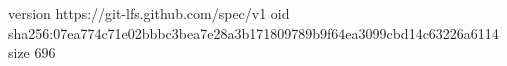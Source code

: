 version https://git-lfs.github.com/spec/v1
oid sha256:07ea774c71e02bbbc3bea7e28a3b171809789b9f64ea3099cbd14c63226a6114
size 696
